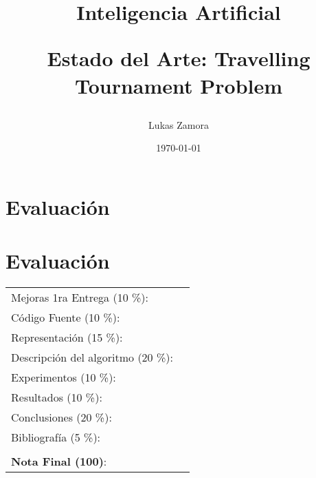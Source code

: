 \documentclass[letter, 10pt]{article}
\begin{document}
\title{Inteligencia Artificial \\ \begin{Large}Estado del Arte: Travelling Tournament Problem\end{Large}}
\author{Lukas Zamora}
\date{\today}
\maketitle


\section*{Evaluaci\'on}

\section*{Evaluaci\'on}

\begin{tabular}{ll}
Mejoras 1ra Entrega (10 \%): &  \underline{\hspace{2cm}}\\
C\'odigo Fuente (10 \%): &  \underline{\hspace{2cm}}\\
Representaci\'on (15 \%):  & \underline{\hspace{2cm}} \\
Descripci\'on del algoritmo (20 \%):  & \underline{\hspace{2cm}} \\
Experimentos (10 \%):  & \underline{\hspace{2cm}} \\
Resultados (10 \%):  & \underline{\hspace{2cm}} \\
Conclusiones (20 \%): &  \underline{\hspace{2cm}}\\
Bibliograf\'ia (5 \%): & \underline{\hspace{2cm}}\\
 &  \\
\textbf{Nota Final (100)}:   & \underline{\hspace{2cm}}
\end{tabular}

\vspace{2cm}
\end{document}
